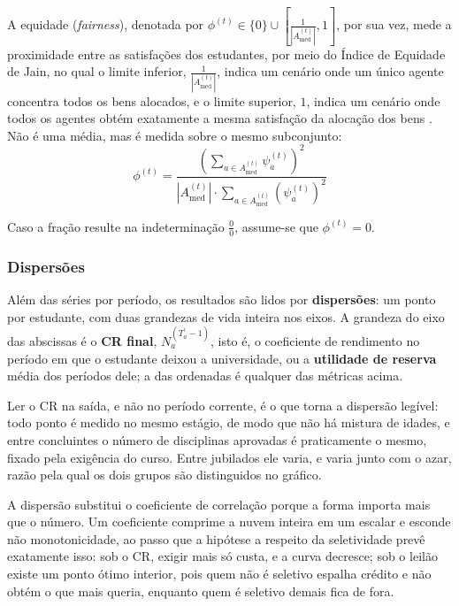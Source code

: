 \documentclass[
    12pt,
    openany,
    oneside,
    a4paper,
    english,
    brazil
]{abntex2}
\begin{document}
A equidade (\textit{fairness}), denotada por $\phi^{(t)} \in \{0\} \cup [\frac{1}{|A_\text{med}^{(t)}|}, 1]$, por sua vez, mede a proximidade entre as satisfações dos estudantes, por meio do Índice de Equidade de Jain, no qual o limite inferior, $\frac{1}{|A_\text{med}^{(t)}|}$, indica um cenário onde um único agente concentra todos os bens alocados, e o limite superior, $1$, indica um cenário onde todos os agentes obtém exatamente a mesma satisfação da alocação dos bens \cite{jain1984quantitative}. Não é uma média, mas é medida sobre o mesmo subconjunto:
\begin{equation}
    \phi^{(t)} = \frac{
        \left( \sum_{a \in A_\text{med}^{(t)}} \psi_a^{(t)} \right)^2
    }{
        \left| A_\text{med}^{(t)} \right| \cdot
        \sum_{a \in A_\text{med}^{(t)}} \left(\psi_a^{(t)}\right)^2
    }
\end{equation}

Caso a fração resulte na indeterminação $\frac{0}{0}$, assume-se que $\phi^{(t)} = 0$.

\subsubsection{Dispersões}

Além das séries por período, os resultados são lidos por \textbf{dispersões}: um ponto por estudante, com duas grandezas de vida inteira nos eixos. A grandeza do eixo das abscissas é o \textbf{CR final}, $N_a^{(T^\prime_a - 1)}$, isto é, o coeficiente de rendimento no período em que o estudante deixou a universidade, ou a \textbf{utilidade de reserva} média dos períodos dele; a das ordenadas é qualquer das métricas acima.

Ler o CR na saída, e não no período corrente, é o que torna a dispersão legível: todo ponto é medido no mesmo estágio, de modo que não há mistura de idades, e entre concluintes o número de disciplinas aprovadas é praticamente o mesmo, fixado pela exigência do curso. Entre jubilados ele varia, e varia junto com o azar, razão pela qual os dois grupos são distinguidos no gráfico.

A dispersão substitui o coeficiente de correlação porque a forma importa mais que o número. Um coeficiente comprime a nuvem inteira em um escalar e esconde não monotonicidade, ao passo que a hipótese a respeito da seletividade prevê exatamente isso: sob o CR, exigir mais só custa, e a curva decresce; sob o leilão existe um ponto ótimo interior, pois quem não é seletivo espalha crédito e não obtém o que mais queria, enquanto quem é seletivo demais fica de fora.
\end{document}
